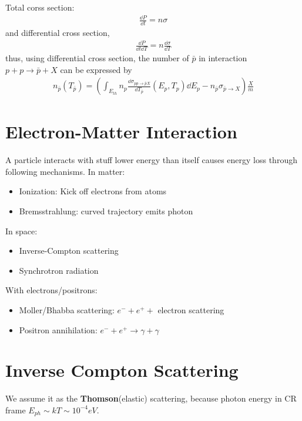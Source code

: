 \documentclass{sciposter}
\begin{document}
\begin{multicols}{3}
Total corss section: 
\begin{align}
    \frac{\dd{P}}{\dd{t}}=n\sigma
\end{align}
and differential cross section,
\begin{align}
    \frac{\dd{P}}{\dd{t}\dd{T}}=n\frac{\dd{\sigma}}{\dd{T}}
\end{align}
thus, using differential cross section, the number of $\bar{p}$ in interaction $p+p\rightarrow \bar{p}+X$ can be expressed by
\begin{align}
    n_{\bar{p}}(T_{\bar{p}} ) =\left(\int_{E_{th} }n_{p}\frac{\dd{\sigma_{pp\rightarrow\bar{p}X} }}{\dd{T_{\bar{p}} }}(E_{p},T_{p}  )\dd{E_{p} }-n_{\bar{p}}\sigma_{\bar{p}\rightarrow X}    \right)\frac{X}{m}
\end{align}



\section{Electron-Matter Interaction}
A particle interacts with stuff lower energy than
itself causes energy loss through following mechanisms. In matter:
\begin{itemize}
    \item Ionization: Kick off electrons from atoms
    \item Bremsstrahlung: curved trajectory emits photon
\end{itemize}
In space:
\begin{itemize}
    \item Inverse-Compton scattering
    \item Synchrotron radiation
\end{itemize}
With electrons/positrons:
\begin{itemize}
    \item Moller/Bhabba scattering: $e^{-} +e^{+}+ $ electron scattering
    \item Positron annihilation: $e^{-}+e^{+}\rightarrow \gamma+\gamma  $
\end{itemize}

\section{Inverse Compton Scattering}
We assume it as the \textbf{Thomson}(elastic) scattering, because photon energy in CR frame $E_{ph} \sim kT \sim 10^{-4}eV $.


\end{multicols}
\end{document}
